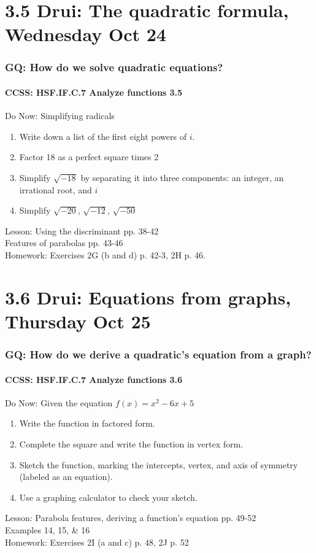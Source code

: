 \documentclass{beamer}
\begin{document}
\section{3.5 Drui: The quadratic formula, Wednesday Oct 24}
  \frame
  {
    \frametitle{GQ: How do we solve quadratic equations?}
    \framesubtitle{CCSS: HSF.IF.C.7 Analyze functions    \alert{3.5}}

    \begin{block}{Do Now: Simplifying radicals}
      \begin{enumerate}
          \item Write down a list of the first eight powers of $i$.
          \item Factor 18 as a perfect square times 2
          \item Simplify $\sqrt{-18}$ by separating it into three components: an integer, an irrational root, and $i$
          \item Simplify $\sqrt{-20}$, $\sqrt{-12}$, $\sqrt{-50}$
      \end{enumerate}
    \end{block}
    Lesson: Using the discriminant pp. 38-42 \\
    Features of parabolas pp. 43-46\\ \bigskip
    Homework: Exercises 2G (b and d) p. 42-3, 2H p. 46.
  }

\section{3.6 Drui: Equations from graphs, Thursday Oct 25}
  \frame
  {
    \frametitle{GQ: How do we derive a quadratic's equation from a graph?}
    \framesubtitle{CCSS: HSF.IF.C.7 Analyze functions    \alert{3.6}}

    \begin{block}{Do Now: Given the equation $f(x)=x^2-6x+5$}
      \begin{enumerate}
          \item Write the function in factored form.
          \item Complete the square and write the function in vertex form.
          \item Sketch the function, marking the intercepts, vertex, and axis of symmetry (labeled as an equation).
          \item Use a graphing calculator to check your sketch.
      \end{enumerate}
    \end{block}
    Lesson: Parabola features, deriving a function's equation pp. 49-52 \\
    Examples 14, 15, \& 16\\ \bigskip
    Homework: Exercises 2I (a and c) p. 48, 2J p. 52
  }
\end{document}
